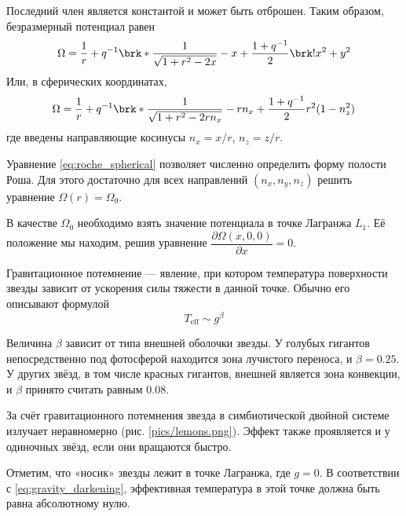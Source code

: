 Последний член является константой и может быть отброшен. Таким образом, безразмерный потенциал равен
\begin{equation}
\Omega = \frac{1}{r} + q^{-1} \brk*{
    \frac{1}{\sqrt{1 + r^2 - 2x}} - x
}
+ \frac{1 + q^{-1}}{2} \brk!{x^2 + y^2}
\label{eq:roche_dekart}
\end{equation}
Или, в сферических координатах,
\begin{equation}
\Omega = \frac{1}{r} + q^{-1} \brk*{
    \frac{1}{\sqrt{1 + r^2 - 2r n_x}} - r n_x
}
+ \frac{1 + q^{-1}}{2} r^2 (1 - n_z^2)
\label{eq:roche_spherical}
\end{equation}
где введены направляющие косинусы $n_x = x / r$, $n_z = z / r$.

Уравнение \eqref{eq:roche_spherical} позволяет численно определить форму полости Роша. Для этого достаточно для всех направлений $(n_x, n_y, n_z)$ решить уравнение $\Omega(r) = \Omega_0.$

В качестве $\Omega_0$ необходимо взять значение потенциала в точке Лагранжа $L_1$. Её положение мы находим, решив уравнение $\dfrac{\partial \Omega(x, 0, 0)}{\partial x} = 0$.



Гравитационное потемнение --- явление, при котором температура поверхности звезды зависит от ускорения силы тяжести в данной точке. Обычно его описывают формулой
\begin{equation}
T_\text{eff} \sim g^\beta
\label{eq:gravity_darkening}
\end{equation}

Величина $\beta$ зависит от типа внешней оболочки звезды. У голубых гигантов непосредственно под фотосферой находится зона лучистого переноса, и $\beta = 0.25$. У других звёзд, в том числе красных гигантов, внешней является зона конвекции, и $\beta$ принято считать равным $0.08$.

За счёт гравитационного потемнения звезда в симбиотической двойной системе излучает неравномерно (рис. \ref{pics/lemons.png}). Эффект также проявляется и у одиночных звёзд, если они вращаются быстро.


Отметим, что «носик» звезды лежит в точке Лагранжа, где $g = 0$. В соответствии с \eqref{eq:gravity_darkening}, эффективная температура в этой точке должна быть равна абсолютному нулю.

